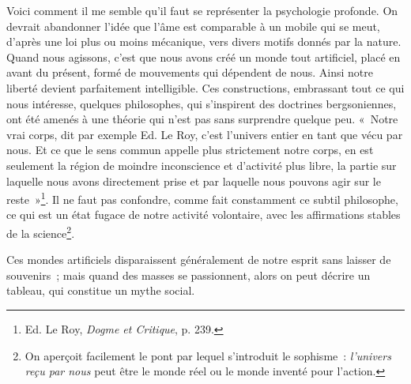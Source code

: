 \documentclass[french,twoside]{book} %
\begin{document}
Voici comment il me semble qu’il faut se représenter la psychologie profonde. On devrait abandonner l’idée que l’âme est comparable à un mobile qui se meut,  d’après une loi plus ou moins mécanique, vers divers motifs donnés par la nature. Quand nous agissons, c’est que nous avons créé un monde tout artificiel, placé en avant du présent, formé de mouvements qui dépendent de nous. Ainsi notre liberté devient parfaitement intelligible. Ces constructions, embrassant tout ce qui nous intéresse, quelques philosophes, qui s’inspirent des doctrines bergsoniennes, ont été amenés à une théorie qui n’est pas sans surprendre quelque peu. « Notre vrai corps, dit par exemple Ed. Le Roy, c’est l’univers entier en tant que vécu par nous. Et ce que le sens commun appelle plus strictement notre corps, en est seulement la région de moindre inconscience et d’activité plus libre, la partie sur laquelle nous avons directement prise et par laquelle nous pouvons agir sur le reste »\footnote{ \noindent Ed. Le Roy, \emph{Dogme et Critique}, p. 239.
 }. Il ne faut pas confondre, comme fait constamment ce subtil philosophe, ce qui est un état fugace de notre activité volontaire, avec les affirmations stables de la science\footnote{ \noindent On aperçoit facilement le pont par lequel s’introduit le sophisme : \emph{l’univers reçu par nous} peut être le monde réel ou le monde inventé pour l’action.
 }.\par
Ces mondes artificiels disparaissent généralement de notre esprit sans laisser de souvenirs ; mais quand des masses se passionnent, alors on peut décrire un tableau, qui constitue un mythe social.\par
\end{document}
